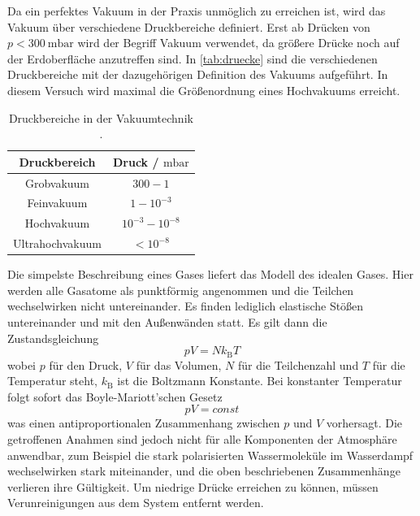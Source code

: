 Da ein perfektes Vakuum in der Praxis unmöglich zu erreichen ist, wird das Vakuum über verschiedene
Druckbereiche definiert. Erst ab Drücken von $p < \qty{300}{\milli\bar}$ \cite{Vakuum_Definition} wird der Begriff Vakuum verwendet,
da größere Drücke noch auf der Erdoberfläche anzutreffen sind.
In \autoref{tab:druecke} sind die verschiedenen Druckbereiche mit der dazugehörigen Definition des Vakuums
aufgeführt. In diesem Versuch wird maximal die Größenordnung eines Hochvakuums erreicht.
\begin{table}[H]
    \centering
    \caption{Druckbereiche in der Vakuumtechnik \cite{Pfeiffer_Vakuum}.}
    \label{tab:druecke}
    \begin{tabular}{c|c}
        \toprule
        Druckbereich & Druck / $\unit{\milli\bar}$\\
        \midrule
        Grobvakuum & $300 - 1$\\
        Feinvakuum & $1 - 10^{-3}$\\
        Hochvakuum & $10^{-3} - 10^{-8}$\\
        Ultrahochvakuum & $<10^{-8}$\\
        \bottomrule
    \end{tabular}
\end{table}
Die simpelste Beschreibung eines Gases liefert das Modell des idealen Gases. Hier werden alle Gasatome als punktförmig angenommen und
die Teilchen wechselwirken nicht untereinander. Es finden lediglich elastische Stößen untereinander und mit den Außenwänden statt.
Es gilt dann die Zustandsgleichung
\begin{equation}
    \label{eqn:gasgleichung}
    p V=N k_{\text{B}} T
\end{equation}
wobei $p$ für den Druck, $V$ für das Volumen, $N$ für die Teilchenzahl und $T$ für die Temperatur steht, $k_{\text{B}}$ ist die Boltzmann Konstante.
Bei konstanter Temperatur folgt sofort das Boyle-Mariott’schen Gesetz
\begin{equation}
    \label{eqn:bmgesetz}
    p V=const
\end{equation}
was einen antiproportionalen Zusammenhang zwischen $p$ und $V$ vorhersagt.
Die getroffenen Anahmen sind jedoch nicht für alle Komponenten der Atmosphäre anwendbar, zum Beispiel die stark polarisierten
Wassermoleküle im Wasserdampf wechselwirken stark miteinander, und die oben beschriebenen Zusammenhänge verlieren ihre Gültigkeit.
Um niedrige Drücke erreichen zu können, müssen Verunreinigungen aus dem System entfernt werden.\\

